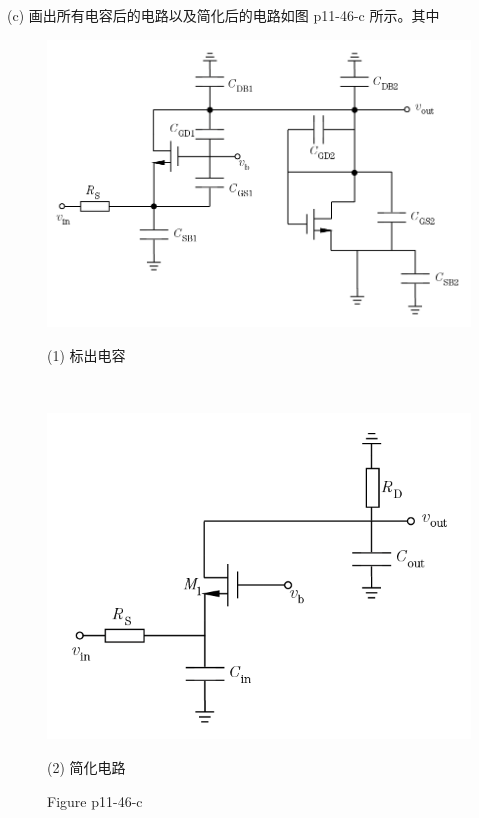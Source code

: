 \documentclass[hyperref, UTF8]{ctexart}
\begin{document}
    (c) 画出所有电容后的电路以及简化后的电路如图 p11-46-c 所示。其中
    \begin{figure}[!htb]
        \centering
        \begin{minipage}[t]{0.577\textwidth}
        \centering
        \includegraphics[width=1\textwidth]{p11-46-c-sol1.png}
        \caption*{(1) 标出电容}
        \end{minipage} \\
        \begin{minipage}[t]{0.424\textwidth}
        \centering
        \includegraphics[width=1\textwidth]{p11-46-c-sol2.png}
        \caption*{(2) 简化电路}
        \end{minipage}
        \caption*{Figure p11-46-c}
    \end{figure}        
\end{document}
